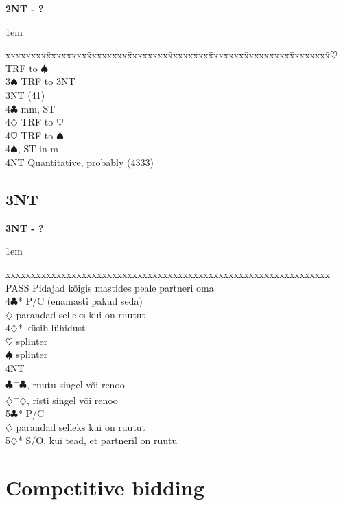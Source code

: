 \documentclass[10pt]{article}
\renewcommand{\c}{$\clubsuit$}
\renewcommand{\d}{$\diamondsuit$}
\newcommand{\h}{$\heartsuit$}
\newcommand{\s}{$\spadesuit$}
\newcommand{\p}{\textsuperscript{+}}
\newenvironment{bidtable}[1][]
{\textbf{#1}
  \begin{adjustwidth}{1em}{}
    \addvspace{2pt}
    \begin{tabbing}
      xxxxxxxx\=xxxxxxxx\=xxxxxxxx\=xxxxxxxx\=xxxxxxxx\=xxxxxxx\=xxxxxxxxx\=xxxxxxxx\=\kill}
{\end{tabbing}\end{adjustwidth}\bigskip}%
\begin{document}
\begin{bidtable}[2NT - ?]
3\h \> TRF to \s                          \\
3\s \> TRF to 3NT                         \\
3NT (41)                             \\
4\c {} mm, ST                          \\
4\d \> TRF to \h                          \\
4\h \> TRF to \s                          \\
4\s {}, ST in m                      \\
4NT \> Quantitative, probably (4333)      \\
\end{bidtable}

\subsection{3NT}

\begin{bidtable}[3NT - ?]
PASS \> Pidajad kõigis mastides peale partneri oma \\
4\c* \> P/C (enamasti pakud seda)                  \\
     \d \> parandad selleks kui on ruutut      \\
4\d* \> küsib lühidust                             \\
     \h \> splinter                            \\
     \s \> splinter                            \\
     \> 4NT                                 \\
     \c {}\p\c , ruutu singel või renoo      \\
     \d {}\p\d , risti singel või renoo      \\
5\c* \> P/C                                        \\
     \d \> parandad selleks kui on ruutut      \\
5\d* \> S/O, kui tead, et partneril on ruutu
\end{bidtable}

\newpage

\section{Competitive bidding}
\end{document}
